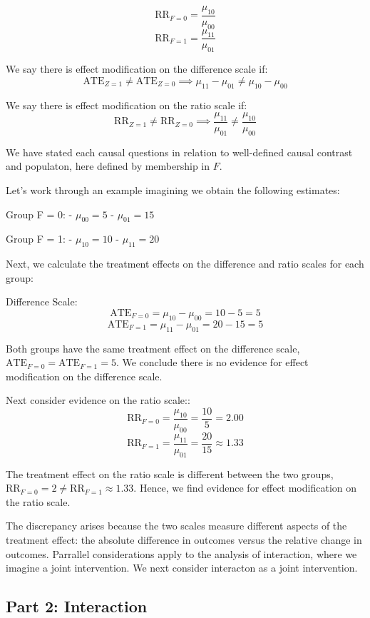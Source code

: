 \documentclass[
  single column]{article}
\begin{document}
\[
\text{RR}_{F = 0} = \frac{\mu_{10}}{\mu_{00}}
\] \[
\text{RR}_{F = 1} = \frac{\mu_{11}}{\mu_{01}}
\]

We say there is effect modification on the difference scale if: \[
\text{ATE}_{Z = 1} \neq \text{ATE}_{Z = 0} \implies \mu_{11} - \mu_{01} \neq \mu_{10} - \mu_{00}
\]

We say there is effect modification on the ratio scale if: \[
\text{RR}_{Z = 1} \neq \text{RR}_{Z = 0} \implies \frac{\mu_{11}}{\mu_{01}} \neq \frac{\mu_{10}}{\mu_{00}}
\]

We have stated each causal questions in relation to well-defined causal
contrast and populaton, here defined by membership in \(F\).

Let's work through an example imagining we obtain the following
estimates:

Group F = 0: - \(\mu_{00} = 5\) - \(\mu_{01} = 15\)

Group F = 1: - \(\mu_{10} = 10\) - \(\mu_{11} = 20\)

Next, we calculate the treatment effects on the difference and ratio
scales for each group:

Difference Scale: \[
\text{ATE}_{F = 0} = \mu_{10} - \mu_{00} = 10 - 5 = 5
\] \[
\text{ATE}_{F = 1} = \mu_{11} - \mu_{01} = 20 - 15 = 5
\]

Both groups have the same treatment effect on the difference scale,
\(\text{ATE}_{F = 0} = \text{ATE}_{F = 1} = 5\). We conclude there is no
evidence for effect modification on the difference scale.

Next consider evidence on the ratio scale:: \[
\text{RR}_{F = 0} = \frac{\mu_{10}}{\mu_{00}} = \frac{10}{5} = 2.00
\] \[
\text{RR}_{F = 1} = \frac{\mu_{11}}{\mu_{01}} = \frac{20}{15} \approx 1.33
\]

The treatment effect on the ratio scale is different between the two
groups, \(\text{RR}_{F = 0} = 2 \neq \text{RR}_{F = 1} \approx 1.33\).
Hence, we find evidence for effect modification on the ratio scale.

The discrepancy arises because the two scales measure different aspects
of the treatment effect: the absolute difference in outcomes versus the
relative change in outcomes. Parrallel considerations apply to the
analysis of interaction, where we imagine a joint intervention. We next
consider interacton as a joint intervention.

\subsection{Part 2: Interaction}\label{part-2-interaction}
\end{document}
